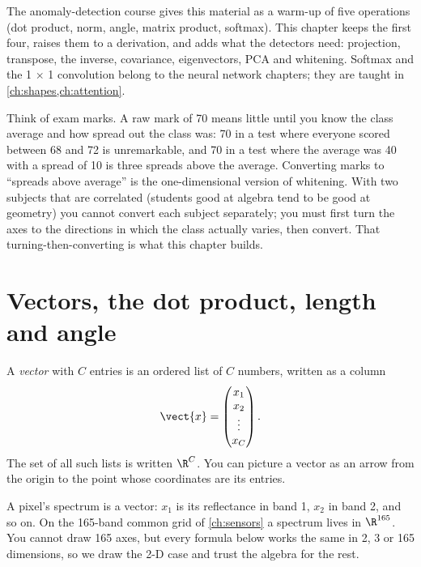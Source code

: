 The anomaly-detection course gives this material as a warm-up of five operations (dot product,
norm, angle, matrix product, softmax). This chapter keeps the first four, raises them to a
derivation, and adds what the detectors need: projection, transpose, the inverse, covariance,
eigenvectors, PCA and whitening. Softmax and the 1 $\times$ 1 convolution belong to the neural
network chapters; they are taught in \cref{ch:shapes,ch:attention}.

\begin{analogy}
Think of exam marks. A raw mark of 70 means little until you know the class average and how
spread out the class was: 70 in a test where everyone scored between 68 and 72 is unremarkable,
and 70 in a test where the average was 40 with a spread of 10 is three spreads above the
average. Converting marks to ``spreads above average'' is the one-dimensional version of
whitening. With two subjects that are correlated (students good at algebra tend to be good at
geometry) you cannot convert each subject separately; you must first turn the axes to the
directions in which the class actually varies, then convert. That turning-then-converting is
what this chapter builds.
\end{analogy}

\section{Vectors, the dot product, length and angle}\label{sec:linalg:vectors}

\begin{definition}[Vector]
A \emph{vector} with $C$ entries is an ordered list of $C$ numbers, written as a column
\[
\vect{x} = \begin{pmatrix} x_1 \\ x_2 \\ \vdots \\ x_C \end{pmatrix}.
\]
The set of all such lists is written $\R^C$. You can picture a vector as an arrow from the
origin to the point whose coordinates are its entries.
\end{definition}

A pixel's spectrum is a vector: $x_1$ is its reflectance in band 1, $x_2$ in band 2, and so on.
On the 165-band common grid of \cref{ch:sensors} a spectrum lives in $\R^{165}$. You cannot draw
165 axes, but every formula below works the same in 2, 3 or 165 dimensions, so we draw the 2-D
case and trust the algebra for the rest.

